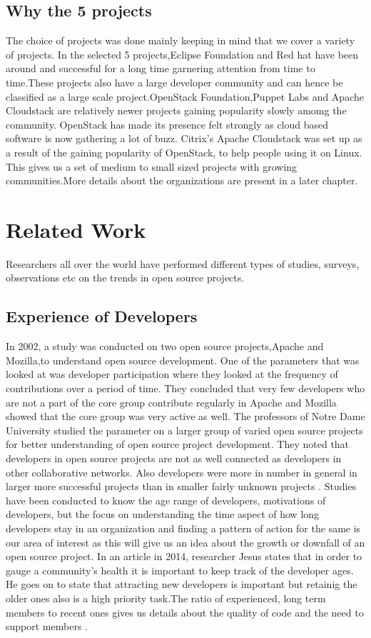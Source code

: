 \documentclass[seploa]{beavtex}
\begin{document}
\section{Why the 5 projects}
The choice of projects was done mainly keeping in mind that we cover a variety of projects. In the selected 5 projects,Eclipse Foundation and Red hat have been around and successful for a long time garnering attention from time to time.These projects also have a large developer community and can hence be classified as a large scale project.OpenStack Foundation,Puppet Labs and Apache Cloudstack are relatively newer projects gaining popularity slowly amomg the community. OpenStack has made its presence felt strongly as cloud based software is now gathering a lot of buzz. Citrix's Apache Cloudstack was set up as a result of the gaining popularity of OpenStack, to help people using it on Linux. This gives us a set of medium to small sized projects with growing communities.More details about the organizations are present in a later chapter.

\chapter{Related Work}
Researchers all over the world have performed different types of studies, surveys, observations etc on the trends in open source projects.
\section{Experience of Developers}
In 2002, a study was conducted on two open source projects,Apache and Mozilla,to understand open source development. One of the parameters that was looked at was developer participation where they looked at the frequency of contributions over a period of time. They concluded that very few developers who are not a part of the core group contribute regularly in Apache and Mozilla showed that the core group was very active as well\cite{mockus2002}. The professors of Notre Dame University studied the parameter on a larger group of varied open source projects for better understanding of open source project development. They noted that developers in open source projects are not as well connected as developers in other collaborative networks. Also developers were more in number in general in larger more successful projects than in smaller fairly unknown projects \cite{greg2002}. Studies have been conducted to know the age range of developers, motivations of developers, but the focus on understanding the time aspect of how long developers stay in an organization and finding a pattern of action for the same is our area of interest as this will give us an idea about the growth or downfall of an open source project. In an article in 2014, researcher Jesus states that in order to gauge a community's health it is important to keep track of the developer ages. He goes on to state that attracting new developers is important but retainig the older ones also is a high priority task.The ratio of experienced, long term members to recent ones gives us details about the quality of code and the need to support members \cite{jes2014}.
\end{document}

